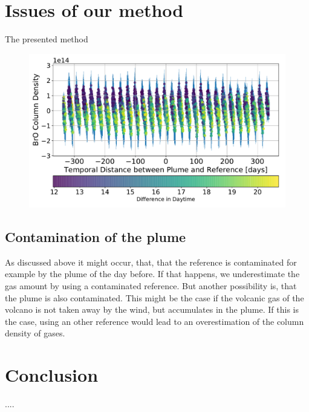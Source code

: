 \documentclass  [
  paper    = a4,
  BCOR     = 10mm,
  twoside,
  fontsize = 12pt,
  fleqn,
  toc      = bibnumbered,
  toc      = listofnumbered,
  numbers  = noendperiod,
  headings = normal,
  listof   = leveldown,
  version  = 3.03
]                                       {scrreprt}
\begin{document}
	\chapter{Issues of our method}
	The presented method 
	\begin{figure}
		\centering
		\includegraphics[width=0.7\linewidth]{Bilder/BrO_Dep/D2J2140_0_6_02_18_DiffDaytime_BrO}
		\caption{}
		\label{fig:d2j2140060218diffdaytimebro}
	\end{figure}
	
	\section{Contamination of the plume}
	
	 As discussed above it might occur, that, that the reference is contaminated for example by the plume of the day before. If that happens, we underestimate the gas amount by using a contaminated reference. But another possibility is, that the plume is also contaminated. This might be the case if the volcanic gas of the volcano is not taken away by the wind, but accumulates in the plume. If this is the case, using an other reference would lead to an overestimation of the column density of gases.


	\chapter{Conclusion}
	....
	
	
	
\end{document}
